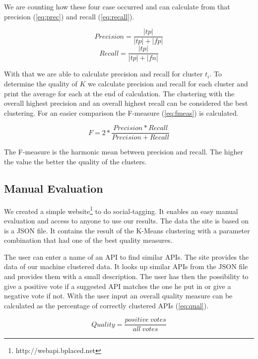 \documentclass[a4paper]{IEEEtran}
\begin{document}
\vspace{2mm}
We are counting how these four case occurred and can calculate from that precision (\ref{eq:prec}) and recall (\ref{eq:recall}). 

\begin{equation}
\label{eq:prec}
Precision= \frac{|tp|}{|tp|+|fp|}
\end{equation}
\begin{equation}
\label{eq:recall}
Recall= \frac{|tp|}{|tp|+|fn|}
\end{equation}

With that we are able to calculate precision and recall for cluster $t_i$. To determine the quality of $K$ we calculate precision and recall for each cluster and print the average for each at the end of calculation. The clustering with the overall highest precision and an overall highest recall can be considered the best clustering. For an easier comparison the F-measure (\ref{eq:fmeas}) is calculated. 

\begin{equation}
\label{eq:fmeas}
F=2* \frac{Precision*Recall}{Precision+Recall}
\end{equation}

The F-measure is the harmonic mean between precision and recall. The higher the value the better the quality of the clusters.

\subsection{Manual Evaluation}
We created a simple website\footnote{http://webapi.bplaced.net} to do social-tagging. It enables an easy manual evaluation and access to anyone to use our results. The data the site is based on is a JSON file. It contains the result of the K-Means clustering with a parameter combination that had one of the best quality measures.

The user can enter a name of an API to find similar APIs. The site provides the data of our machine clustered data. It looks up similar APIs from the JSON file and provides them with a small description. The user has then the possibility to give a positive vote if a suggested API matches the one he put in or give a negative vote if not.
With the user input an overall quality measure can be calculated as the percentage of correctly clustered APIs (\ref{eq:qual}).

\begin{equation}
\label{eq:qual}
Quality= \frac{positive~votes}{all~votes}
\end{equation}
\end{document}

